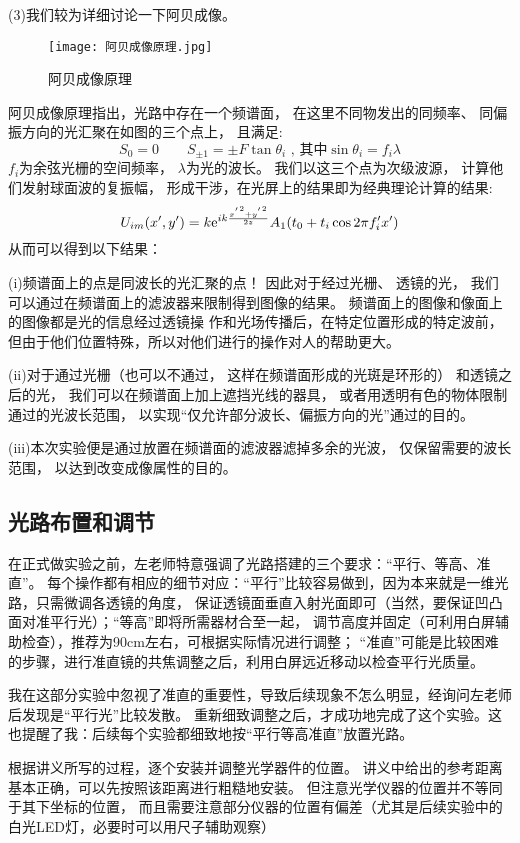 \documentclass[11pt]{article}
\begin{document}
(3)我们较为详细讨论一下阿贝成像。
\begin{figure}[H]
    \centering
    \texttt{[image: 阿贝成像原理.jpg]}
    \caption{阿贝成像原理}
\end{figure}
阿贝成像原理指出，光路中存在一个频谱面，
在这里不同物发出的同频率、
同偏振方向的光汇聚在如图的三个点上，
且满足:
\[
    S_0=0\qquad S_{\pm 1} = \pm F\tan{\theta_i}\text{ , 其中}\sin{\theta_i} = f_i\lambda
\]
$f_i$为余弦光栅的空间频率，
$\lambda$为光的波长。
我们以这三个点为次级波源，
计算他们发射球面波的复振幅，
形成干涉，在光屏上的结果即为经典理论计算的结果:
\[
        U_{im}(x',y')=k{\rm e}^{ik\frac{{x^{'}}^2+{y^{'}}^2}{2z}}A_1(t_0+t_i\cos 2\pi f'_ix')
\]
从而可以得到以下结果：

(i)频谱面上的点是同波长的光汇聚的点！
因此对于经过光栅、
透镜的光，
我们可以通过在频谱面上的滤波器来限制得到图像的结果。
频谱面上的图像和像面上的图像都是光的信息经过透镜操
作和光场传播后，在特定位置形成的特定波前，
但由于他们位置特殊，所以对他们进行的操作对人的帮助更大。

(ii)对于通过光栅（也可以不通过，
这样在频谱面形成的光斑是环形的）
和透镜之后的光，
我们可以在频谱面上加上遮挡光线的器具，
或者用透明有色的物体限制通过的光波长范围，
以实现“仅允许部分波长、偏振方向的光”通过的目的。

(iii)本次实验便是通过放置在频谱面的滤波器滤掉多余的光波，
仅保留需要的波长范围，
以达到改变成像属性的目的。

\subsection{光路布置和调节}

在正式做实验之前，左老师特意强调了光路搭建的三个要求：“平行、等高、准直”。
每个操作都有相应的细节对应：“平行”比较容易做到，因为本来就是一维光路，只需微调各透镜的角度，
保证透镜面垂直入射光面即可（当然，要保证凹凸面对准平行光）；“等高”即将所需器材合至一起，
调节高度并固定（可利用白屏辅助检查），推荐为90cm左右，可根据实际情况进行调整；
“准直”可能是比较困难的步骤，进行准直镜的共焦调整之后，利用白屏远近移动以检查平行光质量。

我在这部分实验中忽视了准直的重要性，导致后续现象不怎么明显，经询问左老师后发现是“平行光”比较发散。
重新细致调整之后，才成功地完成了这个实验。这也提醒了我：后续每个实验都细致地按“平行等高准直”放置光路。

根据讲义所写的过程，逐个安装并调整光学器件的位置。
讲义中给出的参考距离基本正确，可以先按照该距离进行粗糙地安装。
但注意光学仪器的位置并不等同于其下坐标的位置，
而且需要注意部分仪器的位置有偏差（尤其是后续实验中的白光LED灯，必要时可以用尺子辅助观察）
\end{document}

